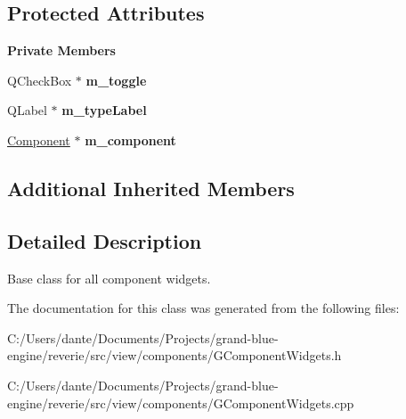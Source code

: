 \subsection*{Protected Attributes}
\begin{Indent}\textbf{ Private Members}\par
\begin{DoxyCompactItemize}
\item 
\mbox{\label{classrev_1_1_view_1_1_component_widget_ac82a6c68513798d434a16b9cb74c0321}} 
Q\+Check\+Box $\ast$ {\bfseries m\+\_\+toggle}
\item 
\mbox{\label{classrev_1_1_view_1_1_component_widget_ad9ee29ee48f84d1156ae64dc9a5c5be9}} 
Q\+Label $\ast$ {\bfseries m\+\_\+type\+Label}
\item 
\mbox{\label{classrev_1_1_view_1_1_component_widget_a9047fabb76db695a82eaf2010f178140}} 
\mbox{\hyperlink{classrev_1_1_component}{Component}} $\ast$ {\bfseries m\+\_\+component}
\end{DoxyCompactItemize}
\end{Indent}
\subsection*{Additional Inherited Members}


\subsection{Detailed Description}
Base class for all component widgets. 

The documentation for this class was generated from the following files\+:\begin{DoxyCompactItemize}
\item 
C\+:/\+Users/dante/\+Documents/\+Projects/grand-\/blue-\/engine/reverie/src/view/components/G\+Component\+Widgets.\+h\item 
C\+:/\+Users/dante/\+Documents/\+Projects/grand-\/blue-\/engine/reverie/src/view/components/G\+Component\+Widgets.\+cpp\end{DoxyCompactItemize}
